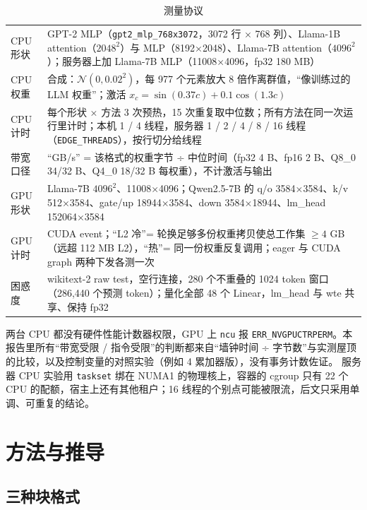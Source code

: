 \documentclass[11pt,a4paper]{ctexart}
\begin{document}
\begin{table}[H]
\centering\small
\caption{测量协议}\label{tab:protocol}
\begin{tabularx}{\linewidth}{>{\raggedright\arraybackslash}p{2.2cm} >{\raggedright\arraybackslash}X}
\toprule
CPU 形状 & GPT-2 MLP（\texttt{gpt2\_mlp\_768x3072}，3072 行 × 768 列）、Llama-1B attention（$2048^2$）与 MLP（8192×2048）、Llama-7B attention（$4096^2$）；服务器上加 Llama-7B MLP（11008×4096，fp32 180 MB） \\
CPU 权重 & 合成：$\mathcal{N}(0, 0.02^2)$，每 977 个元素放大 8 倍作离群值，“像训练过的 LLM 权重”；激活 $x_c = \sin(0.37c) + 0.1\cos(1.3c)$ \\
CPU 计时 & 每个形状 × 方法 3 次预热，15 次重复取中位数；所有方法在同一次运行里计时；本机 1 / 4 线程，服务器 1 / 2 / 4 / 8 / 16 线程（\texttt{EDGE\_THREADS}），按行切分给线程 \\
带宽口径 & “GB/s” = 该格式的权重字节 ÷ 中位时间（fp32 4 B、fp16 2 B、Q8\_0 34/32 B、Q4\_0 18/32 B 每权重），不计激活与输出 \\
GPU 形状 & Llama-7B $4096^2$、11008×4096；Qwen2.5-7B 的 q/o 3584×3584、k/v 512×3584、gate/up 18944×3584、down 3584×18944、lm\_head 152064×3584 \\
GPU 计时 & CUDA event；“L2 冷”= 轮换足够多份权重拷贝使总工作集 $\ge 4$ GB（远超 112 MB L2），“热”= 同一份权重反复调用；eager 与 CUDA graph 两种下发各测一次 \\
困惑度 & wikitext-2 raw test，空行连接，280 个不重叠的 1024 token 窗口（286{,}440 个预测 token）；量化全部 48 个 Linear，lm\_head 与 wte 共享、保持 fp32 \\
\bottomrule
\end{tabularx}
\end{table}

两台 CPU 都没有硬件性能计数器权限，GPU 上 \texttt{ncu} 报 \texttt{ERR\_NVGPUCTRPERM}。本报告里所有“带宽受限 / 指令受限”的判断都来自“墙钟时间 ÷ 字节数”与实测屋顶的比较，以及控制变量的对照实验（例如 4 累加器版），没有事务计数佐证。
服务器 CPU 实验用 \texttt{taskset} 绑在 NUMA1 的物理核上，容器的 cgroup 只有 22 个 CPU 的配额，宿主上还有其他租户；16 线程的个别点可能被限流，后文只采用单调、可重复的结论。

\section{方法与推导}\label{sec:method}

\subsection{三种块格式}\label{sec:formats}
\end{document}
